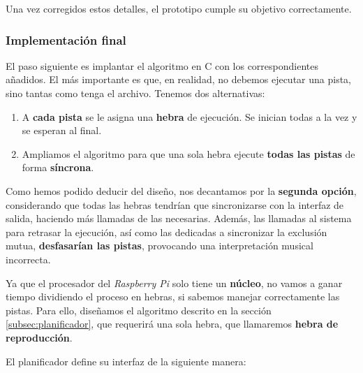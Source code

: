 Una vez corregidos estos detalles, el prototipo cumple su objetivo correctamente. 

\subsubsection{Implementación final}

El paso siguiente es implantar el algoritmo en C con los correspondientes añadidos. El más importante es que, en realidad, no debemos ejecutar una pista, sino tantas como tenga el archivo. Tenemos dos alternativas:

\begin{enumerate}
	\item A \textbf{cada pista} se le asigna una \textbf{hebra} de ejecución. Se inician todas a la vez y se esperan al final.
	\item Ampliamos el algoritmo para que una sola hebra ejecute \textbf{todas las pistas} de forma \textbf{síncrona}.
\end{enumerate}

Como hemos podido deducir del diseño, nos decantamos por la \textbf{segunda opción}, considerando que todas las hebras tendrían que sincronizarse con la interfaz de salida, haciendo más llamadas de las necesarias. Además, las llamadas al sistema para retrasar la ejecución, así como las dedicadas a sincronizar la exclusión mutua, \textbf{desfasarían las pistas}, provocando una interpretación musical incorrecta.

Ya que el procesador del \textit{Raspberry Pi} solo tiene un \textbf{núcleo}, no vamos a ganar tiempo dividiendo el proceso en hebras, si sabemos manejar correctamente las pistas. Para ello, diseñamos el algoritmo descrito en la sección \ref{subsec:planificador}, que requerirá una sola hebra, que llamaremos \textbf{hebra de reproducción}.

El planificador define su interfaz de la siguiente manera:

